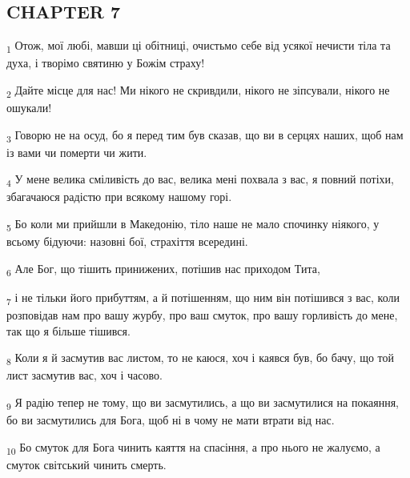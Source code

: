 \subsection{CHAPTER 7}
\begin{tcolorbox}
\textsubscript{1} Отож, мої любі, мавши ці обітниці, очистьмо себе від усякої нечисти тіла та духа, і творімо святиню у Божім страху!
\end{tcolorbox}
\begin{tcolorbox}
\textsubscript{2} Дайте місце для нас! Ми нікого не скривдили, нікого не зіпсували, нікого не ошукали!
\end{tcolorbox}
\begin{tcolorbox}
\textsubscript{3} Говорю не на осуд, бо я перед тим був сказав, що ви в серцях наших, щоб нам із вами чи померти чи жити.
\end{tcolorbox}
\begin{tcolorbox}
\textsubscript{4} У мене велика сміливість до вас, велика мені похвала з вас, я повний потіхи, збагачаюся радістю при всякому нашому горі.
\end{tcolorbox}
\begin{tcolorbox}
\textsubscript{5} Бо коли ми прийшли в Македонію, тіло наше не мало спочинку ніякого, у всьому бідуючи: назовні бої, страхіття всередині.
\end{tcolorbox}
\begin{tcolorbox}
\textsubscript{6} Але Бог, що тішить принижених, потішив нас приходом Тита,
\end{tcolorbox}
\begin{tcolorbox}
\textsubscript{7} і не тільки його прибуттям, а й потішенням, що ним він потішився з вас, коли розповідав нам про вашу журбу, про ваш смуток, про вашу горливість до мене, так що я більше тішився.
\end{tcolorbox}
\begin{tcolorbox}
\textsubscript{8} Коли я й засмутив вас листом, то не каюся, хоч і каявся був, бо бачу, що той лист засмутив вас, хоч і часово.
\end{tcolorbox}
\begin{tcolorbox}
\textsubscript{9} Я радію тепер не тому, що ви засмутились, а що ви засмутилися на покаяння, бо ви засмутились для Бога, щоб ні в чому не мати втрати від нас.
\end{tcolorbox}
\begin{tcolorbox}
\textsubscript{10} Бо смуток для Бога чинить каяття на спасіння, а про нього не жалуємо, а смуток світський чинить смерть.
\end{tcolorbox}
